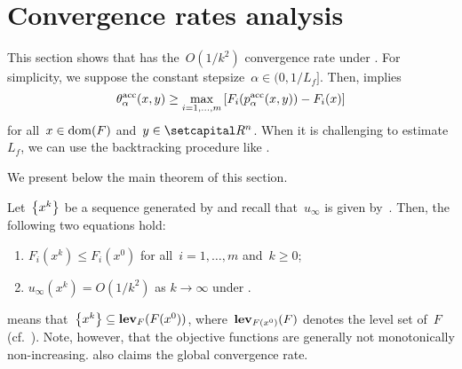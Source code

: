 \documentclass[../main]{subfiles}
\begin{document}
\section{Convergence rates analysis} 
This section shows that  has the~$O(1 / k^2)$ convergence rate under .
For simplicity, we suppose the constant stepsize~$\alpha \in (0, 1 / L_f]$.
Then,  implies
\begin{equation} \label{eq:acc_pgm_sdc}
    \theta^\acc_\alpha(x, y) \ge \max_{i = 1, \dots, m}\left[ F_i(p^\acc_\alpha(x, y)) - F_i(x) \right]
\end{equation}
for all~$x \in \dom(F)$ and~$y \in \setR^n$.
When it is challenging to estimate~$L_f$, we can use the backtracking procedure like .

We present below the main theorem of this section.
\begin{theorem} 
    Let~$\set*{x^k}$ be a sequence generated by  and recall that~$u_\infty$ is given by~.
    Then, the following two equations hold:
    \begin{enumerate}
        \item $F_i\left(x^k\right) \le F_i(x^0)$ for all~$i = 1, \dots, m$ and~$k \ge 0$; 
        \item $u_\infty\left(x^k\right) = O(1 / k^2)$ as $k \to \infty$ under . 
    \end{enumerate}
\end{theorem}
 means that~$\set*{x^k} \subseteq \level_F(F(x^0))$, where~$\level_{F(x^0)}(F)$ denotes the level set of~$F$ (cf.~).
Note, however, that the objective functions are generally not monotonically non-increasing.
 also claims the global convergence rate.
\end{document}
